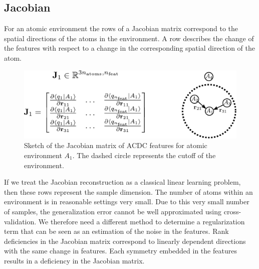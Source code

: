 \subsection{Jacobian}
For an atomic environment the rows of a Jacobian matrix correspond to the spatial directions of the atoms in the environment.
A row describes the change of the features with respect to a change in the corresponding spatial direction of the atom.
\begin{figure}
    \centering
    \includegraphics[width=\textwidth]{fig/jacobian.pdf}
    \caption{Sketch of the Jacobian matrix of ACDC features for atomic environment $A_1$. The dashed circle represents the cutoff of the environment.}
    \label{fig:jacobian}
\end{figure}
If we treat the Jacobian reconstruction as a classical linear learning problem, then these rows represent the sample dimension.
The number of atoms within an environment is in reasonable settings very small.
Due to this very small number of samples, the generalization error cannot be well approximated using cross-validation.
We therefore need a different method to determine a regularization term that can be seen as an estimation of the noise in the features.
Rank deficiencies in the Jacobian matrix correspond to linearly dependent directions with the same change in features.
Each symmetry embedded in the features results in a deficiency in the Jacobian matrix.
